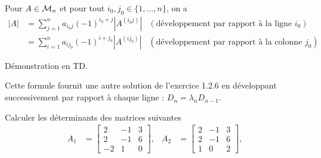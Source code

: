 \begin{proposition*}
  Pour $A \in \mathcal{M}_n$ et pour tout $i_0, j_0 \in \{1, \dots, n\}$, on a 
  \begin{align*}
    |A| 
    & = \sum_{j=1}^n a_{i_0j} (-1)^{i_0+j} |A^{(i_0j)}| & (\text{développement par rapport à la ligne $i_0$}) \\
    & = \sum_{i=1}^n a_{ij_0} (-1)^{i+j_0} |A^{(ij_0)}| & (\text{développement par rapport à la colonne $j_0$})
  \end{align*}
\end{proposition*}

\proof Démonstration en TD. \eproof

\remark Cette formule fournit une autre solution de l'exercice 1.2.6 en développant successivement par rapport à chaque ligne : $D_n = \lambda_n D_{n-1}$.

\begin{exercise*}
  Calculer les déterminants des matrices suivantes 
  \begin{align*}
    A_1 & = \left[\begin{array}{rrr}
      2 & -1 & 3 \\ 2 & -1 & 6 \\ -2 & 1 & 0
      \end{array}\right], &
    A_2 & = \left[\begin{array}{rrr}
      2 & -1 & 3 \\ 2 & -1 & 6 \\ 1 & 0  & 2
      \end{array}\right], \\
  \end{align*}
\end{exercise*}

